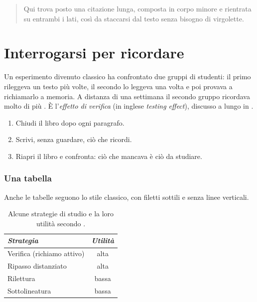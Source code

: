 \begin{quote}
Qui trova posto una citazione lunga, composta in corpo minore e
rientrata su entrambi i lati, così da staccarsi dal testo senza
bisogno di virgolette.
\end{quote}

\asterismo

\section{Interrogarsi per ricordare}

Un esperimento divenuto classico ha confrontato due gruppi di studenti:
il primo rileggeva un testo più volte, il secondo lo leggeva una volta
e poi provava a richiamarlo a memoria. A distanza di una settimana il
secondo gruppo ricordava molto di più \parencite{roediger2006}. È
l'\emph{effetto di verifica} (in inglese \emph{testing effect}),
discusso a lungo in \textcite{brown2014}.

\begin{inpratica}
\begin{enumerate}
  \item Chiudi il libro dopo ogni paragrafo.
  \item Scrivi, senza guardare, ciò che ricordi.
  \item Riapri il libro e confronta: ciò che mancava è ciò da studiare.
\end{enumerate}
\end{inpratica}

\subsubsection{Una tabella} Anche le tabelle seguono lo stile
classico, con filetti sottili e senza linee verticali.

\begin{table}[tbp]
  \centering\small
  \begin{tabular}{@{}lc@{}}
    \toprule
    \textit{Strategia} & \textit{Utilità} \\
    \midrule
    Verifica (richiamo attivo) & alta \\
    Ripasso distanziato       & alta \\
    Rilettura                 & bassa \\
    Sottolineatura            & bassa \\
    \bottomrule
  \end{tabular}
  \caption{Alcune strategie di studio e la loro utilità secondo
    \textcite{dunlosky2013}.}
  \label{tab:strategie}
\end{table}

